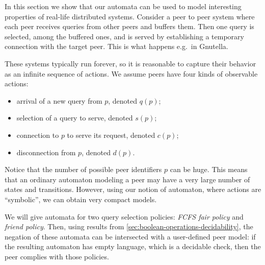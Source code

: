 
In this section we show that our automata can be used to model interesting properties of real-life distributed systems. Consider a peer to peer system where each peer receives queries from other peers and buffers them. Then one query is selected, among the buffered ones, and is served by establishing a temporary connection with the target peer. This is what happens e.g.\ in Gnutella.

These systems typically run forever, so it is reasonable to capture their behavior as an infinite sequence of actions. We assume peers have four kinds of observable actions: 
\begin{itemize}
	\item arrival of a new query from $p$, denoted $q(p)$; 
	\item selection of a query to serve, denoted $s(p)$; 
	\item connection to $p$ to serve its request, denoted $c(p)$; 
	\item disconnection from $p$, denoted $d(p)$.
\end{itemize}
%
Notice that the number of possible peer identifiers $p$ can be huge. This means that an ordinary automaton modeling a peer may have a very large number of states and transitions. However, using our notion of automaton, where actions are ``symbolic'', we can obtain very compact models.

We will give automata for two query selection policies: \emph{FCFS fair policy} and \emph{friend policy}. Then, using results from \autoref{sec:boolean-operations-decidability}, the negation of these automata can be intersected with a user-defined peer model: if the resulting automaton has empty language, which is a decidable check, then the peer complies with those policies.



